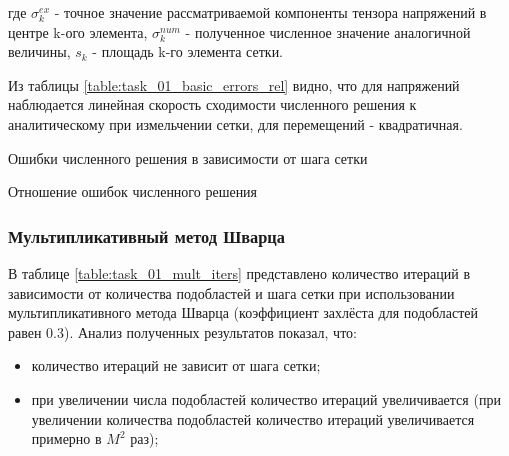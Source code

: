 \documentclass[a4paper, 14pt]{extarticle}
\newcommand{\taskNum}{01}
\begin{document}
где $\sigma_k^{ex}$ - точное значение рассматриваемой компоненты тензора напряжений в центре k-ого элемента, $\sigma_k^{num}$ - полученное численное значение аналогичной величины, $s_k$ - площадь k-го элемента сетки. 

\newpage

Из таблицы \ref{table:task_\taskNum_basic_errors_rel} видно, что для напряжений наблюдается линейная скорость сходимости численного решения к аналитическому при измельчении сетки, для перемещений - квадратичная.
\begin{table}[h]
\caption{Ошибки численного решения в зависимости от шага сетки}
\label{table:task_\taskNum_basic_errors}
\end{table}

\begin{table}[h]
\caption{Отношение ошибок численного решения}
\label{table:task_\taskNum_basic_errors_rel}
\end{table}

\newpage

\subsubsection{Мультипликативный метод Шварца}

В таблице \ref{table:task_\taskNum_mult_iters} представлено количество итераций в зависимости от количества подобластей и шага сетки при использовании мультипликативного метода Шварца (коэффициент захлёста для подобластей равен 0.3). Анализ полученных результатов показал, что:
\begin{itemize}
\item количество итераций не зависит от шага сетки;
\item при увеличении числа подобластей количество итераций увеличивается (при увеличении количества подобластей количество итераций увеличивается примерно в $M^2$ раз);
\end{itemize}
\end{document}
